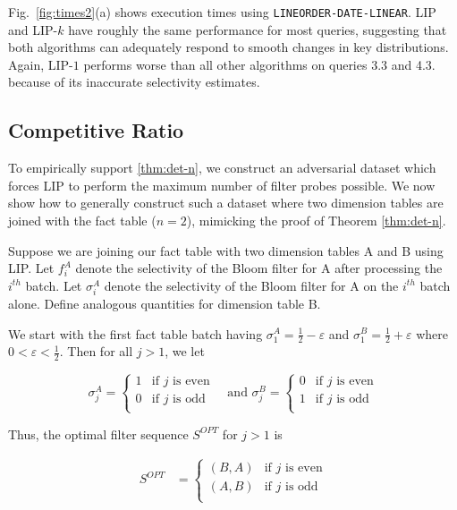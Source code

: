 Fig.~\ref{fig:times2}(a) shows execution times using \texttt{LINEORDER-DATE-LINEAR}. 
LIP and LIP-$k$ have roughly the same performance for most queries, 
suggesting that both algorithms can adequately respond to smooth changes in key distributions.
Again, LIP-$1$ performs worse than all other algorithms on queries 3.3 and 4.3.
because of its inaccurate selectivity estimates.

\subsection{Competitive Ratio}
\label{sec:ratio}

To empirically support \ref{thm:det-n}, we construct an adversarial dataset which forces LIP to perform the maximum number of filter probes possible.
We now show how to generally construct such a dataset where two dimension tables are joined with the fact table ($n = 2$), mimicking the proof of Theorem \ref{thm:det-n}.

Suppose we are joining our fact table with two dimension tables A and B using LIP.
Let $f_i^A$ denote the selectivity of the Bloom filter for A after processing the $i^{th}$ batch. 
Let $\sigma_i^A$ denote the selectivity of the Bloom filter for A on the $i^{th}$ batch alone. 
Define analogous quantities for dimension table B.

We start with the first fact table batch having
$\sigma_1^A = \frac{1}{2} - \varepsilon$ and $\sigma_1^B = \frac{1}{2} + \varepsilon$ where $0 < \varepsilon < \frac{1}{2}$. Then for all $j > 1$, we let

\begin{equation*}
\sigma_j^A = 
    \begin{cases}
    1 & \text{if $j$ is even} \\[0.5em]
    0 & \text{if $j$ is odd} \\
    \end{cases} \quad \text{and }
\sigma_j^B = 
    \begin{cases}
    0 & \text{if $j$ is even} \\[0.5em]
    1 &  \text{if $j$ is odd} \\
    \end{cases}
\end{equation*}

Thus, the optimal filter sequence $S^{OPT}$ for $j > 1$ is 

\begin{align*}
S^{OPT} &= 
    \begin{cases}
    (B, A) & \text{if $j$ is even} \\[0.5em]
    (A, B) & \text{if $j$ is odd} \\
    \end{cases}\\[0.5em]
\end{align*}

